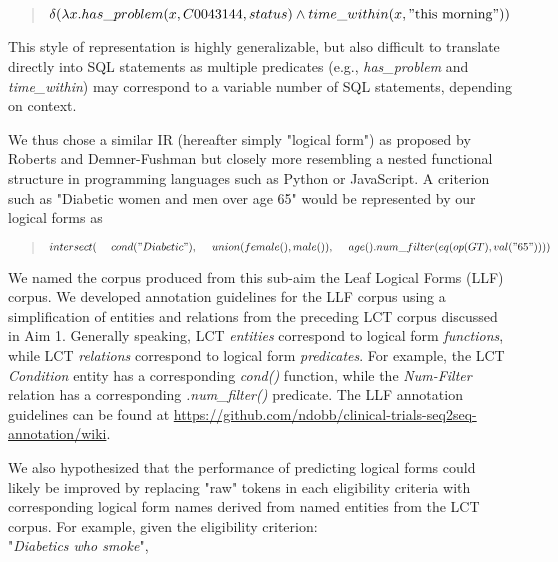 \documentclass[../main.tex]{subfiles}
\begin{document}
\begin{quote}
    \centering
    $\delta( \lambda x.has\_problem(x, C0043144, status) \wedge time\_within(x, \mathrm{"this\ morning"}))$
\end{quote}

\noindent This style of representation is highly generalizable, but also difficult to translate directly into SQL statements as multiple predicates (e.g., \textit{has\_problem} and \textit{time\_within}) may correspond to a variable number of SQL statements, depending on context.

We thus chose a similar IR (hereafter simply "logical form") as proposed by Roberts and Demner-Fushman but closely more resembling a nested functional structure in programming languages such as Python or JavaScript. A criterion such as "Diabetic women and men over age 65" would be represented by our logical forms as

\begin{quote}
$intersect( \\
    \mathrm{\ \ \ \ }cond("Diabetic"), \\
    \mathrm{\ \ \ \ }union(female(), male()),\\
    \mathrm{\ \ \ \ }age().num\_filter(eq(op(GT), val("65"))) \\
)$
\end{quote}

We named the corpus produced from this sub-aim the Leaf Logical Forms (LLF) corpus. We developed annotation guidelines for the LLF corpus using a simplification of entities and relations from the preceding LCT corpus discussed in Aim 1. Generally speaking, LCT \textit{entities} correspond to logical form \textit{functions}, while LCT \textit{relations} correspond to logical form \textit{predicates}. For example, the LCT \textit{Condition} entity has a corresponding \textit{cond()} function, while the \textit{Num-Filter} relation has a corresponding \textit{.num\_filter()} predicate. The LLF annotation guidelines can be found at \url{https://github.com/ndobb/clinical-trials-seq2seq-annotation/wiki}.

We also hypothesized that the performance of predicting logical forms could likely be improved by replacing "raw" tokens in each eligibility criteria with corresponding logical form names derived from named entities from the LCT corpus. For example, given the eligibility criterion: \\

"\textit{Diabetics who smoke}", \\
\end{document}
